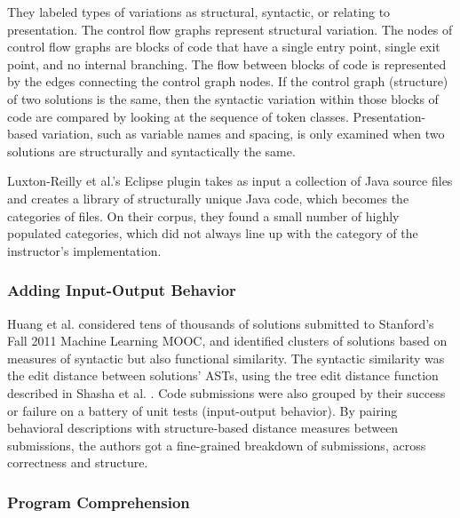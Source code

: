 \documentclass[12pt]{article}
\begin{document}
They labeled types of variations as structural, syntactic, or relating to presentation. The control flow graphs represent structural variation. The nodes of control flow graphs are blocks of code that have a single entry point, single exit point, and no internal branching. The flow between blocks of code is represented by the edges connecting the control graph nodes. If the control graph (structure) of two solutions is the same, then the syntactic variation within those blocks of code are compared by looking at the sequence of token classes. Presentation-based variation, such as variable names and spacing, is only examined when two solutions are structurally and syntactically the same.

Luxton-Reilly et al.'s Eclipse plugin takes as input a collection of Java source files and creates a library of structurally unique Java code, which becomes the categories of files. On their corpus, they found a small number of highly populated categories, which did not always line up with the category of the instructor's implementation.

\subsubsection{Adding Input-Output Behavior}

Huang et al. \cite{MOOCshop} considered tens of thousands of solutions submitted to Stanford's Fall 2011 Machine Learning MOOC, and identified clusters of solutions based on measures of syntactic but also functional similarity. The syntactic similarity was the edit distance between solutions' ASTs, using the tree edit distance function described in Shasha et al. \cite{shasha1994exact}. Code submissions were also grouped by their success or failure on a battery of unit tests (input-output behavior). By pairing behavioral descriptions with structure-based distance measures between submissions, the authors got a fine-grained breakdown of submissions, across correctness and structure.

\subsubsection{Program Comprehension}
\end{document}
